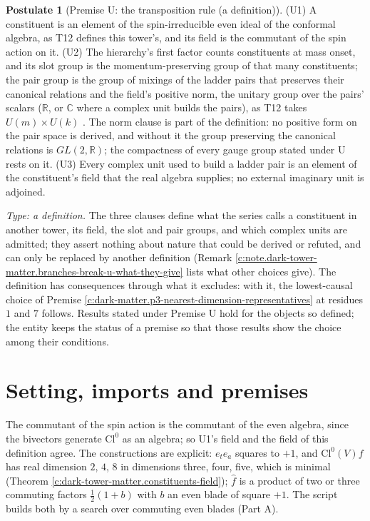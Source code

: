 \documentclass[11pt]{article}
\theoremstyle{definition}
\newtheorem{postulate}[theorem]{Postulate}
\theoremstyle{plain}
\newcommand{\changedmark}[2]{\marginpar{\raggedright\scriptsize\color{#1}#2}}
\providecommand{\C}{}\renewcommand{\C}{\mathbb{C}}
\providecommand{\Cl}{}\renewcommand{\Cl}{\mathrm{Cl}}
\providecommand{\R}{}\renewcommand{\R}{\mathbb{R}}
\providecommand{\hf}{}\renewcommand{\hf}{\hat{f}}
\begin{document}
\begin{postulate}[Premise U: the transposition rule (a definition)]\label{c:dark-tower-matter.u-transposition-rule}
\changedmark{BurntOrange}{changed since the deposit}
(U1) A constituent is an element of the spin-irreducible even ideal of the conformal algebra, as T12 defines this tower's, and its field is the commutant of the spin action on it. (U2) The hierarchy's first factor counts constituents at mass onset, and its slot group is the momentum-preserving group of that many constituents; the pair group is the group of mixings of the ladder pairs that preserves their canonical relations and the field's positive norm, the unitary group over the pairs' scalars ($\R$, or $\C$ where a complex unit builds the pairs), as T12 takes $U(m) \times U(k)$ \cite[Thm.~4.1]{ButlerT12}. The norm clause is part of the definition: no positive form on the pair space is derived, and without it the group preserving the canonical relations is $GL(2,\R)$; the compactness of every gauge group stated under U rests on it. (U3) Every complex unit used to build a ladder pair is an element of the constituent's field that the real algebra supplies; no external imaginary unit is adjoined.

\emph{Type: a definition.} The three clauses define what the series calls a constituent in another tower, its field, the slot and pair groups, and which complex units are admitted; they assert nothing about nature that could be derived or refuted, and can only be replaced by another definition (Remark \ref{c:note.dark-tower-matter.branches-break-u-what-they-give} lists what other choices give). The definition has consequences through what it excludes: with it, the lowest-causal choice of Premise \ref{c:dark-matter.p3-nearest-dimension-representatives} at residues $1$ and $7$ follows. Results stated under Premise U hold for the objects so defined; the entity keeps the status of a premise so that those results show the choice among their conditions.
\end{postulate}

\section{Setting, imports and premises}

\label{c:note.dark-tower-matter.setting-constituents-momentum-where-mass-begins}
The commutant of the spin action is the commutant of the even algebra, since the bivectors generate $\Cl^{0}$ as an algebra; so U1's field and the field of this definition agree. The constructions are explicit: $e_{t}e_{a}$ squares to $+1$, and $\Cl^{0}(V)f$ has real dimension $2$, $4$, $8$ in dimensions three, four, five, which is minimal (Theorem \ref{c:dark-tower-matter.constituents-field}); $\hf$ is a product of two or three commuting factors $\tfrac{1}{2}(1 + b)$ with $b$ an even blade of square $+1$. The script builds both by a search over commuting even blades (Part A).
\end{document}
